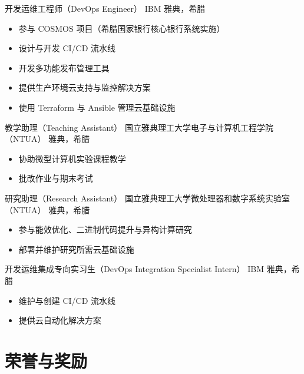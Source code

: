 \documentclass[11pt,a4paper,sans]{moderncv}
\begin{document}
{开发运维工程师（DevOps Engineer）}
{IBM}
{雅典，希腊}
{}
{
\begin{itemize}
\item 参与 COSMOS 项目（希腊国家银行核心银行系统实施）
\item 设计与开发 CI/CD 流水线
\item 开发多功能发布管理工具
\item 提供生产环境云支持与监控解决方案
\item 使用 Terraform 与 Ansible 管理云基础设施
\end{itemize}
}

{教学助理（Teaching Assistant）}
{国立雅典理工大学电子与计算机工程学院（NTUA）}
{雅典，希腊}
{}
{
\begin{itemize}
\item 协助微型计算机实验课程教学
\item 批改作业与期末考试
\end{itemize}
}

{研究助理（Research Assistant）}
{国立雅典理工大学微处理器和数字系统实验室（NTUA）}
{雅典，希腊}
{}
{
\begin{itemize}
\item 参与能效优化、二进制代码提升与异构计算研究
\item 部署并维护研究所需云基础设施
\end{itemize}
}

{开发运维集成专向实习生（DevOps Integration Specialist Intern）}
{IBM}
{雅典，希腊}
{}
{
\begin{itemize}
\item 维护与创建 CI/CD 流水线
\item 提供云自动化解决方案
\end{itemize}
}

\section{荣誉与奖励}



\end{document}
